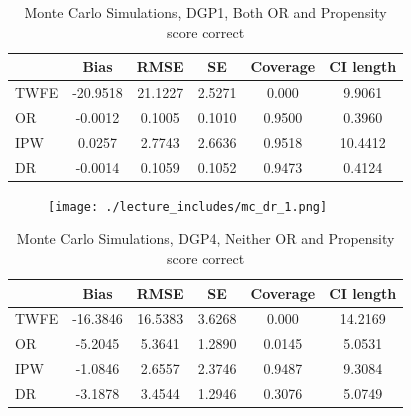 \documentclass{beamer}
\begin{document}
\begin{frame}[plain]

\begin{table}[htbp]\centering
\scriptsize
\caption{Monte Carlo Simulations, DGP1, Both OR and Propensity score correct}
\centering
\begin{threeparttable}
\begin{tabular}{l*{5}{c}}
\toprule
\multicolumn{1}{l}{\textbf{}}&
\multicolumn{1}{c}{\textbf{Bias}}&
\multicolumn{1}{c}{\textbf{RMSE}}&
\multicolumn{1}{c}{\textbf{SE}}&
\multicolumn{1}{c}{\textbf{Coverage}}&
\multicolumn{1}{c}{\textbf{CI length}}\\
\midrule
TWFE & -20.9518 & 21.1227 & 2.5271 & 0.000 & 9.9061 \\
OR & -0.0012 & 0.1005 & 0.1010 & 0.9500 & 0.3960 \\
IPW & 0.0257 & 2.7743 & 2.6636 & 0.9518 & 10.4412 \\
DR & -0.0014 & 0.1059 & 0.1052 & 0.9473 & 0.4124 \\
\bottomrule
\end{tabular}
\end{threeparttable}
\end{table}

\end{frame}


\begin{frame}[plain]
	\begin{figure}
	\texttt{[image: ./lecture\_includes/mc\_dr\_1.png]}
	\end{figure}

\end{frame}


\begin{frame}[plain]

\begin{table}[htbp]\centering
\scriptsize
\caption{Monte Carlo Simulations, DGP4, Neither OR and Propensity score correct}
\centering
\begin{threeparttable}
\begin{tabular}{l*{5}{c}}
\toprule
\multicolumn{1}{l}{\textbf{}}&
\multicolumn{1}{c}{\textbf{Bias}}&
\multicolumn{1}{c}{\textbf{RMSE}}&
\multicolumn{1}{c}{\textbf{SE}}&
\multicolumn{1}{c}{\textbf{Coverage}}&
\multicolumn{1}{c}{\textbf{CI length}}\\
\midrule
TWFE & -16.3846 & 16.5383 & 3.6268 & 0.000 & 14.2169 \\
OR & -5.2045 & 5.3641 & 1.2890 & 0.0145 & 5.0531 \\
IPW & -1.0846 & 2.6557 & 2.3746 & 0.9487 & 9.3084 \\
DR & -3.1878 & 3.4544 & 1.2946 & 0.3076 & 5.0749 \\
\bottomrule
\end{tabular}
\end{threeparttable}
\end{table}

\end{frame}
\end{document}

